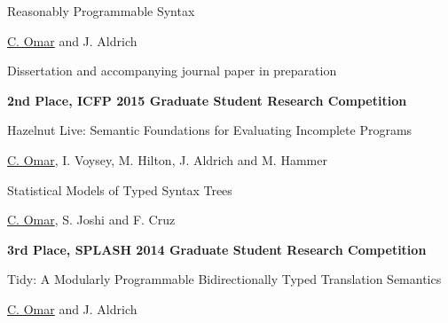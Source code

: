 \documentclass[10pt,letterpaper]{article}
\renewenvironment{itemize}{
  \begin{list}{}{
    \setlength{\leftmargin}{1.5em}
    \setlength{\itemsep}{0.25em}
    \setlength{\parskip}{0pt}
    \setlength{\parsep}{0.25em}
  }
}{
  \end{list}
}
\begin{document}
\begin{enumerate}[resume]
\item Reasonably Programmable Syntax
  \begin{itemize}
    \item \underline{C. Omar} and J. Aldrich
    \item Dissertation and accompanying journal paper in preparation
    \item \textbf{2nd Place, ICFP 2015 Graduate Student Research Competition}
  \end{itemize}
\item Hazelnut Live: Semantic Foundations for Evaluating Incomplete Programs
  \begin{itemize}
    \item \underline{C. Omar}, I. Voysey, M. Hilton, J. Aldrich and M. Hammer
  \end{itemize}
\item Statistical Models of Typed Syntax Trees
  \begin{itemize}
    \item \underline{C. Omar}, S. Joshi and F. Cruz
    \item \textbf{3rd Place, SPLASH 2014 Graduate Student Research Competition}
  \end{itemize}
\item Tidy: A Modularly Programmable Bidirectionally Typed Translation Semantics
  \begin{itemize}
    \item \underline{C. Omar} and J. Aldrich
  \end{itemize}
\end{enumerate}
\end{document}
